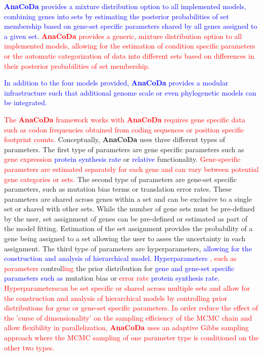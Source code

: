 \documentclass{bioinfo}
\newcommand{\package}{\textbf{AnaCoDa}\xspace} %
\begin{document}
\textcolor{blue}{
\package provides a mixture distribution option to all implemented models, combining genes into sets by estimating the posterior probabilities of set membership based on gene-set specific parameters shared by all genes assigned to a given set. 
}
\textcolor{red}{
\package provides a generic, mixture distribution option to all implemented models, allowing for the estimation of condition specific parameters or the automatic categorization of data into different sets based on differences in their posterior probabilities of set membership.
}

\textcolor{blue}
{
In addition to the four models provided, \package provides a modular infrastructure such that additional genome scale or even phylogenetic models can be integrated.
}

\textcolor{red}{The \package framework works with \package requires gene specific data such as codon frequencies obtained from coding sequences or position specific footprint counts.}
Conceptually, \package uses three different types of parameters.
The first type of parameters are gene specific parameters such as \textcolor{red}{gene expression} \textcolor{blue}{protein synthesis rate} or \textcolor{blue}{relative} functionality.
\textcolor{red}{Gene-specific parameters are estimated separately for each gene and can vary between potential gene categories or sets.}
The second type of parameters are gene-set specific parameters, such as mutation bias terms or translation error rates.
These parameters are shared across genes within a set and can be exclusive to a single set or shared with other sets.
While the number of gene sets must be pre-defined by the user, set assignment of genes can be pre-defined or estimated as part of the model fitting.
Estimation of the set assignment provides the probability of a gene being assigned to a set allowing the user to asses the uncertainty in each assignment.
The third type of parameters are hyperparameters, \textcolor{blue}{allowing for the construction and analysis of hierarchical model. Hyperparameters } \textcolor{red}{, such as parameters} control\textcolor{red}{ling} the prior distribution for \textcolor{blue}{gene and gene-set specific parameters such as} mutation bias or \textcolor{red}{error rate} \textcolor{blue}{protein synthesis rate}.
 \textcolor{red}{Hyperparameterscan be set specific or shared across multiple sets and allow for the construction and analysis of hierarchical models by controlling prior distributions for gene or gene-set specific parameters.
In order reduce the effect of the 'curse of dimensionality' on the sampling efficiency of the MCMC chain and allow flexibility in parallelization, \package uses an adaptive Gibbs sampling approach where the MCMC sampling of one parameter type is conditioned on the other two types.}
\end{document}
